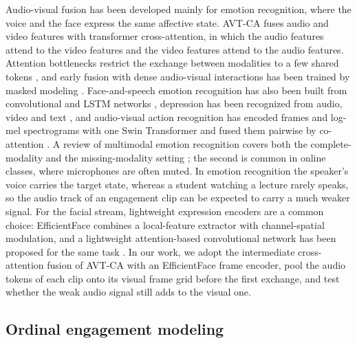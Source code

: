 \documentclass[pdflatex,iicol,sn-basic]{sn-jnl}
\begin{document}
Audio-visual fusion has been developed mainly for emotion recognition, where the voice and the face express the same affective state. AVT-CA \citep{venkatraman2025avtca} fuses audio and video features with transformer cross-attention, in which the audio features attend to the video features and the video features attend to the audio features. Attention bottlenecks restrict the exchange between modalities to a few shared tokens \citep{nagrani2021attention}, and early fusion with dense audio-visual interactions has been trained by masked modeling \citep{mo2024earlyfusion}. Face-and-speech emotion recognition has also been built from convolutional and LSTM networks \citep{taware2025mer}, depression has been recognized from audio, video and text \citep{lu2026dstc}, and audio-visual action recognition has encoded frames and log-mel spectrograms with one Swin Transformer and fused them pairwise by co-attention \citep{kim2024avaction}. A review of multimodal emotion recognition covers both the complete-modality and the missing-modality setting \citep{li2026mersurvey}; the second is common in online classes, where microphones are often muted. In emotion recognition the speaker's voice carries the target state, whereas a student watching a lecture rarely speaks, so the audio track of an engagement clip can be expected to carry a much weaker signal. For the facial stream, lightweight expression encoders are a common choice: EfficientFace \citep{zhao2021efficientface} combines a local-feature extractor with channel-spatial modulation, and a lightweight attention-based convolutional network has been proposed for the same task \citep{vu2026lightweightfer}. In our work, we adopt the intermediate cross-attention fusion of AVT-CA with an EfficientFace frame encoder, pool the audio tokens of each clip onto its visual frame grid before the first exchange, and test whether the weak audio signal still adds to the visual one.

\subsection{Ordinal engagement modeling}\label{sec:rw_ordinal}
\end{document}
